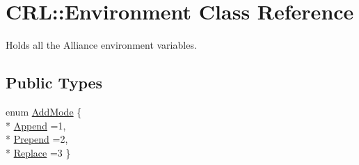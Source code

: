 \hypertarget{classCRL_1_1Environment}{\section{C\-R\-L\-:\-:Environment Class Reference}
\label{classCRL_1_1Environment}
}


Holds all the Alliance environment variables.  


\subsection*{Public Types}
\begin{DoxyCompactItemize}
\item 
enum \hyperlink{classCRL_1_1Environment_ac5692c2f5d20e892573a3d46de222aeb}{Add\-Mode} \{ \\*
\hyperlink{classCRL_1_1Environment_ac5692c2f5d20e892573a3d46de222aeba69ce578d2eeb6a8de507920ccf673b8d}{Append} =1, 
\\*
\hyperlink{classCRL_1_1Environment_ac5692c2f5d20e892573a3d46de222aeba9acc311bf991f5e62be5ea9333083fd0}{Prepend} =2, 
\\*
\hyperlink{classCRL_1_1Environment_ac5692c2f5d20e892573a3d46de222aeba61fc1f828e487ed148c456f3d37be83a}{Replace} =3
 \}
\end{DoxyCompactItemize}
